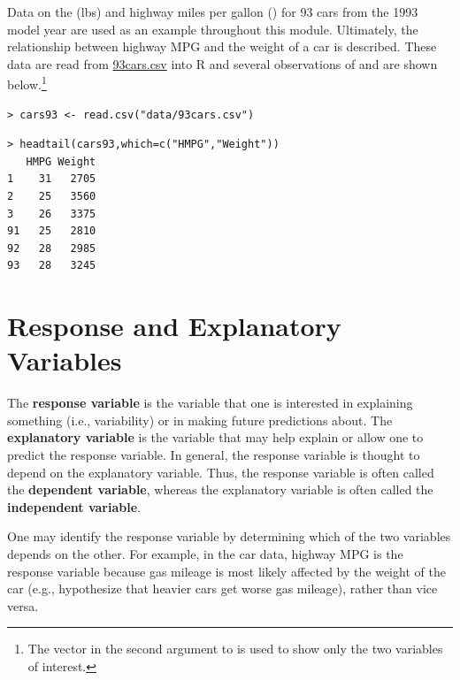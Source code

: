 \documentclass[10pt,openany]{book}\usepackage[]{graphicx}\usepackage[]{color}
\makeatletter
\newenvironment{kframe}{%
 \def\at@end@of@kframe{}%
 \ifinner\ifhmode%
  \def\at@end@of@kframe{\end{minipage}}%
  \begin{minipage}{\columnwidth}%
 \fi\fi%
 \def\FrameCommand##1{\hskip\@totalleftmargin \hskip-\fboxsep
 \colorbox{shadecolor}{##1}\hskip-\fboxsep
     \hskip-\linewidth \hskip-\@totalleftmargin \hskip\columnwidth}%
 \MakeFramed {\advance\hsize-\width
   \@totalleftmargin\z@ \linewidth\hsize
   \@setminipage}}%
 {\par\unskip\endMakeFramed%
 \at@end@of@kframe}
\newenvironment{knitrout}{}{} %
\makeatother
\begin{document}
Data on the  (lbs) and highway miles per gallon () for 93 cars from the 1993 model year are used as an example throughout this module. Ultimately, the relationship between highway MPG and the weight of a car is described. These data are read from \href{https://raw.githubusercontent.com/droglenc/NCData/master/93cars.csv}{93cars.csv} into R and several observations of  and  are shown below.\footnote{The vector in the second argument to  is used to show only the two variables of interest.}

\begin{knitrout}
\color{fgcolor}\begin{kframe}
\begin{verbatim}
> cars93 <- read.csv("data/93cars.csv")
\end{verbatim}
\end{kframe}
\end{knitrout}
\begin{knitrout}
\color{fgcolor}\begin{kframe}
\begin{verbatim}
> headtail(cars93,which=c("HMPG","Weight"))
   HMPG Weight
1    31   2705
2    25   3560
3    26   3375
91   25   2810
92   28   2985
93   28   3245
\end{verbatim}
\end{kframe}
\end{knitrout}



\section[Response and Explanatory] {Response and Explanatory Variables} \label{sect:RespExplan1}
\vspace{-3pt}
The \textbf{response variable} is the variable that one is interested in explaining something (i.e., variability) or in making future predictions about. The \textbf{explanatory variable} is the variable that may help explain or allow one to predict the response variable. In general, the response variable is thought to depend on the explanatory variable. Thus, the response variable is often called the \textbf{dependent variable}, whereas the explanatory variable is often called the \textbf{independent variable}.

One may identify the response variable by determining which of the two variables depends on the other. For example, in the car data, highway MPG is the response variable because gas mileage is most likely affected by the weight of the car (e.g., hypothesize that heavier cars get worse gas mileage), rather than vice versa.
\end{document}
